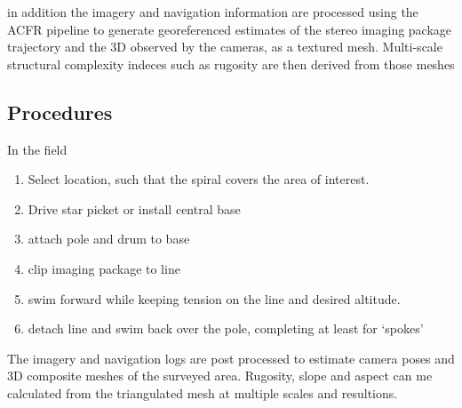 in addition the imagery and navigation information are processed using the ACFR pipeline \cite{Johnson_Roberson_2010} \cite{Mahon_2008} \cite{Johnson_Roberson_2013} to generate georeferenced estimates of the stereo imaging package trajectory and the 3D observed by the cameras, as a textured mesh. Multi-scale structural complexity indeces such as rugosity are then derived from those meshes \cite{Friedman_2012} 

\subsection{Procedures}

In the field\begin{enumerate}
\item Select location, such that the spiral covers the area of interest.
\item Drive star picket or install central base
\item attach pole and drum to base
\item clip imaging package to line
\item swim forward while keeping tension on the line and desired altitude.
\item detach line and swim back over the pole, completing at least for `spokes'
\end{enumerate}

The imagery and navigation logs are post processed to estimate camera poses and 3D composite meshes of the surveyed area. Rugosity, slope and aspect can me calculated from the triangulated mesh at multiple scales and resultions. 

